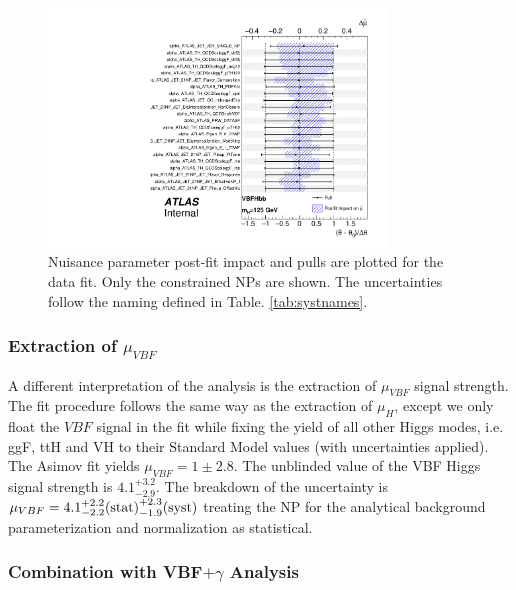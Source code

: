 \begin{figure}[htbp]
  \centering
 \includegraphics[width=0.8\textwidth]{figures/VBF/VBFHbb_pulls_125.pdf}
 \caption{Nuisance parameter post-fit impact and pulls are plotted for the data fit. Only the constrained NPs are shown. The uncertainties follow the naming defined in Table. \ref{tab:systnames}.}
  \label{fig:vbf-higgsfitpull}
\end{figure}



\subsubsection{Extraction of $\mu_{VBF}$}
\label{sec:vbf-higgsunblindvbf}
A different interpretation of the analysis is the extraction of $\mu_{VBF}$ signal strength. The fit procedure follows the same way as the extraction of $\mu_{H}$, except we only float the $VBF$ signal in the fit while fixing the yield of all other Higgs modes, i.e. ggF, ttH and VH to their Standard Model values (with uncertainties applied). The Asimov fit yields $\mu_{VBF}=1\pm 2.8$. The unblinded value of the VBF Higgs signal strength is $4.1^{+3.2}_{-2.9}$. The breakdown of the uncertainty is $\mu_{VBF}=4.1^{+2.2}_{-2.2}\textnormal{(stat)}^{+2.3}_{-1.9}\textnormal{(syst)}$ treating the NP for the  analytical background parameterization and normalization as statistical. 


\subsubsection{Combination with VBF$+\gamma$ Analysis}
\label{sec:vbf-higgscomb}

